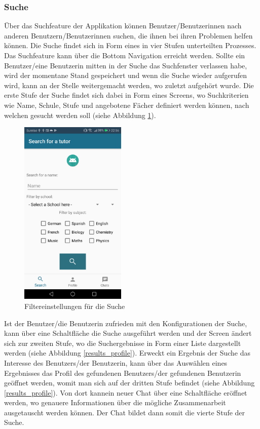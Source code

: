 \documentclass[../main.tex]{subfiles}
\begin{document}
\subsubsection*{Suche}
Über das Suchfeature der Applikation können Benutzer/Benutzerinnen nach anderen Benutzern/Benutzerinnen suchen, die ihnen bei ihren Problemen helfen können. Die Suche findet sich in Form eines in vier Stufen unterteilten Prozesses. Das Suchfeature kann über die Bottom Navigation erreicht werden. Sollte ein Benutzer/eine Benutzerin mitten in der Suche das Suchfenster verlassen habe, wird der momentane Stand gespeichert und wenn die Suche wieder aufgerufen wird, kann an der Stelle weitergemacht werden, wo zuletzt aufgehört wurde. Die erste Stufe der Suche findet sich dabei in Form eines Screens, wo Suchkriterien wie Name, Schule, Stufe und angebotene Fächer definiert werden können, nach welchen gesucht werden soll (siehe Abbildung \ref{searchOverview}).
\begin{figure} 
	\centering
	\includegraphics[width=0.45\textwidth]{./images/searchfilter.png}
	\caption{Filtereinstellungen für die Suche}
	\label{searchOverview}
\end{figure} 
Ist der Benutzer/die Benutzerin zufrieden mit den Konfigurationen der Suche, kann über eine Schaltfläche die Suche ausgeführt werden und der Screen ändert sich zur zweiten Stufe, wo die Suchergebnisse in Form einer Liste dargestellt werden (siehe Abbildung \ref{results_profile}). Erweckt ein Ergebnis der Suche das Interesse des Benutzers/der Benutzerin, kann über das Auswählen eines Ergebnisses das Profil des gefundenen Benutzers/der gefundenen Benutzerin geöffnet werden, womit man sich auf der dritten Stufe befindet (siehe Abbildung  \ref{results_profile}). Von dort kannein neuer Chat über eine Schaltfläche eröffnet werden, wo genauere Informationen über die mögliche Zusammenarbeit ausgetauscht werden können. Der Chat bildet dann somit die vierte Stufe der Suche.
\end{document}
